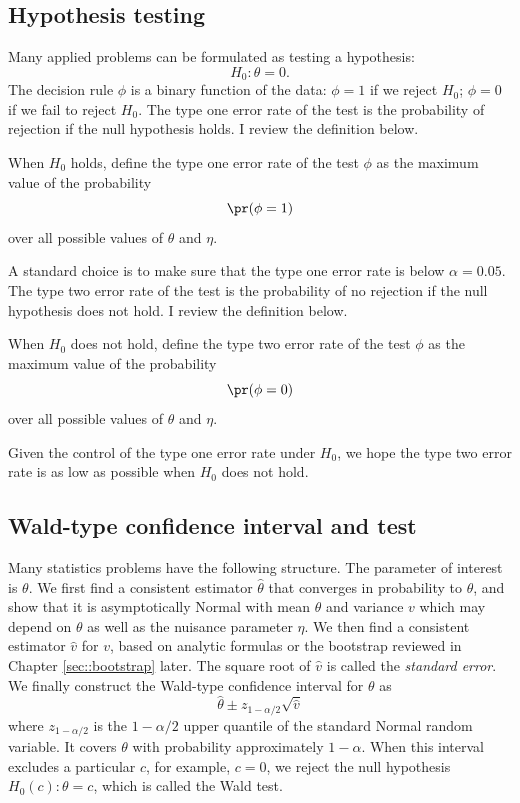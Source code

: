 \subsection{Hypothesis testing}


  Many applied problems can be formulated as testing a hypothesis:
  $$
  H_0: \theta = 0 .
  $$
The decision rule $\phi$ is a binary function of the data: $\phi = 1$ if we reject $H_0$; $\phi = 0$ if we fail to reject   $H_0$. The type one error rate of the test is the probability of rejection if the null hypothesis holds. I review the definition below. 


\begin{definition}
\label{def::size-test}
When $H_0$ holds, define the type one error rate of the test $\phi$ as the maximum value of the probability
$$
\pr(\phi = 1)
$$
over all possible values of $\theta$ and $\eta$.     
\end{definition}
  

A standard choice is to make sure that the type one error rate is below $\alpha = 0.05$. The type two error rate of the test is the probability of no rejection if the null hypothesis does not hold. I review the definition below. 


\begin{definition}
\label{def::type2-error-test}
When $H_0$ does not hold, define the type two error rate of the test $\phi$ as the maximum value of the  probability
$$
\pr(\phi = 0)
$$
over all possible values of $\theta$ and $\eta$.     
\end{definition}


Given the control of the type one error rate under $H_0$, we hope the type two error rate is as low as possible when $H_0$ does not hold. 






\subsection{Wald-type confidence interval and test}\label{section::wald-type-ci-test}


Many statistics problems have the following structure. The parameter of interest is $\theta$. We first find a consistent estimator $\hat\theta$ that converges in probability to $\theta$, and show that it is asymptotically Normal with mean $\theta$ and variance $v$ which may depend on $\theta$ as well as the nuisance parameter $\eta$. We then find a consistent estimator $\hat v$ for $v$, based on analytic formulas or the bootstrap reviewed in Chapter \ref{sec::bootstrap} later. 
The square root of $\hat v$ is called the {\it standard error}. 
We finally construct the Wald-type confidence interval for $\theta$ as
$$
\hat{\theta} \pm z_{1-\alpha/2} \sqrt{ \hat{v} }
$$  
where $z_{1-\alpha/2}$ is the $1-\alpha/2$ upper quantile of the standard Normal random variable.
It covers $\theta$ with probability approximately $1-\alpha$. When this interval excludes a particular $c$, for example, $c = 0$, we reject the null hypothesis $H_0(c): \theta = c$, which is called the Wald test. 

